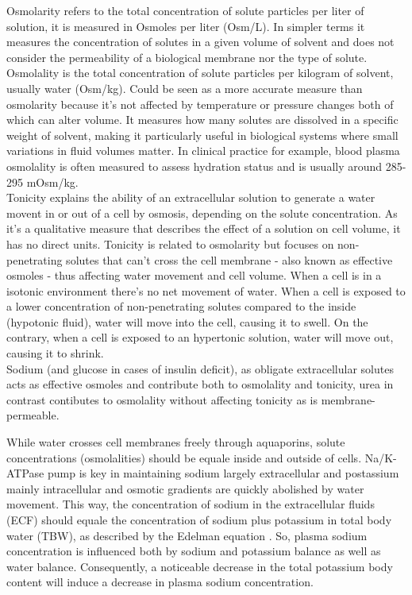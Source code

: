 Osmolarity refers to the total concentration of solute particles per liter of solution, it is measured in Osmoles per liter (Osm/L). 
\newline In simpler terms it measures the concentration of solutes in a given volume of solvent and does not consider the permeability of a biological membrane nor the type of solute.\\

Osmolality is the total concentration of solute particles per kilogram of solvent, usually water (Osm/kg).
\newline Could be seen as a more accurate measure than osmolarity because it’s not affected by temperature or pressure changes both of which can alter volume. It measures how many solutes are dissolved in a specific weight of solvent, making it particularly useful in biological systems where small variations in fluid volumes matter. In clinical practice for example, blood plasma osmolality is often measured to assess hydration status and is usually around 285-295 mOsm/kg.\\

Tonicity explains the ability of an extracellular solution to generate a water movent in or out of a cell by osmosis, depending on the solute concentration. As it’s a qualitative measure that describes the effect of a solution on cell volume, it has no direct units. 
\newline Tonicity is related to osmolarity but focuses on non-penetrating solutes that can’t cross the cell membrane - also known as effective osmoles - thus affecting water movement and cell volume. When a cell is in a isotonic environment there’s no net movement of water. When a cell is exposed to a lower concentration of non-penetrating solutes compared to the inside (hypotonic fluid), water will move into the cell, causing it to swell. On the contrary, when a cell is exposed to an hypertonic solution, water will move out, causing it to shrink.\\

Sodium (and glucose in cases of insulin deficit), as obligate extracellular solutes acts as effective osmoles and contribute both to osmolality and tonicity, urea in contrast contibutes to osmolality without affecting tonicity as is membrane-permeable.

While water crosses cell membranes freely through aquaporins, solute concentrations (osmolalities) should be equale inside and outside of cells. Na/K-ATPase pump is key in maintaining sodium largely extracellular and postassium mainly intracellular and osmotic gradients are quickly abolished by water movement. This way, the concentration of sodium in the extracellular fluids (ECF) should equale the concentration of sodium plus potassium in total body water (TBW), as described by the Edelman equation \cite{sternsDisordersPlasmaSodium2015a}. So, plasma sodium concentration is influenced both by sodium and potassium balance as well as water balance. Consequently, a noticeable decrease in the total potassium body content will induce a decrease in plasma sodium concentration.	\\

